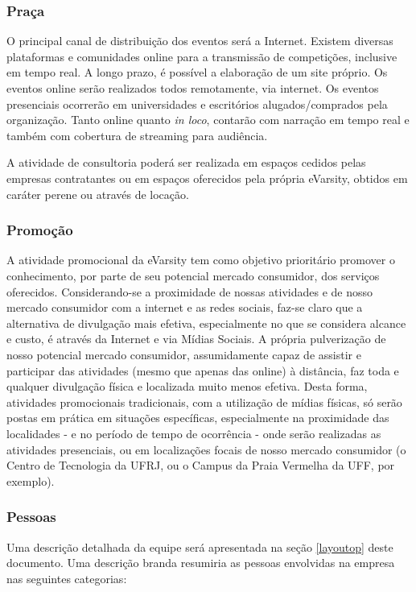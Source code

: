 \documentclass[a4paper, 12pt]{paper}
\begin{document}
\subsubsection{Praça}
O principal canal de distribuição dos eventos será a Internet. Existem diversas plataformas e comunidades online para a transmissão de competições, inclusive em tempo real. A longo prazo, é possível a elaboração de um site próprio. Os eventos online serão realizados todos remotamente, via internet. Os eventos presenciais ocorrerão em universidades e escritórios alugados/comprados pela organização. Tanto online quanto \textit{in loco}, contarão com narração em tempo real e também com cobertura de streaming para audiência.

A atividade de consultoria poderá ser realizada em espaços cedidos pelas empresas contratantes ou em espaços oferecidos pela própria eVarsity, obtidos em caráter perene ou através de locação.
\subsubsection{Promoção}
A atividade promocional da eVarsity tem como objetivo prioritário promover o conhecimento, por parte de seu potencial mercado consumidor, dos serviços oferecidos. Considerando-se a proximidade de nossas atividades e de nosso mercado consumidor com a internet e as redes sociais, faz-se claro que a alternativa de divulgação mais efetiva, especialmente no que se considera alcance e custo, é através da Internet e via Mídias Sociais. A própria pulverização de nosso potencial mercado consumidor, assumidamente capaz de assistir e participar das atividades (mesmo que apenas das online) à distância, faz toda e qualquer divulgação física e localizada muito menos efetiva. Desta forma, atividades promocionais tradicionais, com a utilização de mídias físicas, só serão postas em prática em situações específicas, especialmente na proximidade das localidades - e no período de tempo de ocorrência - onde serão realizadas as atividades presenciais, ou em localizações focais de nosso mercado consumidor (o Centro de Tecnologia da UFRJ, ou o Campus da Praia Vermelha da UFF, por exemplo).
\subsubsection{Pessoas}
Uma descrição detalhada da equipe será apresentada na seção \ref{layoutop} deste documento. Uma descrição branda resumiria as pessoas envolvidas na empresa nas seguintes categorias:
\end{document}
